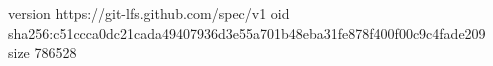 version https://git-lfs.github.com/spec/v1
oid sha256:c51ccca0dc21cada49407936d3e55a701b48eba31fe878f400f00c9c4fade209
size 786528
